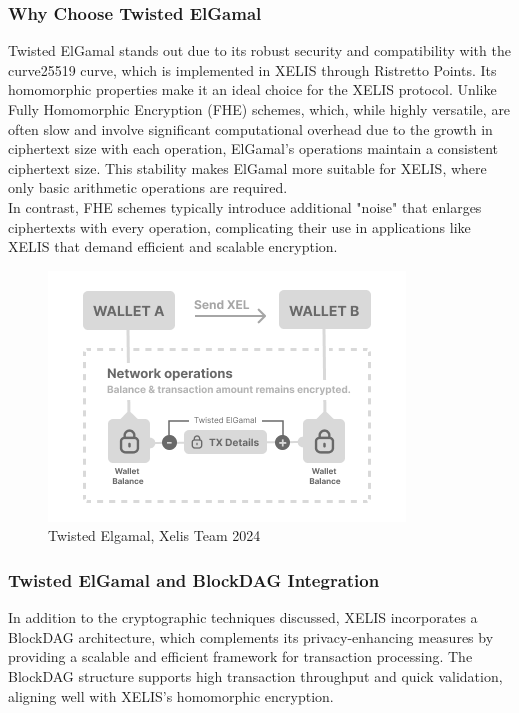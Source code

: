 \documentclass[10pt,a4paper,twocolumn]{article}
\begin{document}
\subsubsection{Why Choose Twisted ElGamal}

Twisted ElGamal stands out due to its robust security and compatibility with the curve25519 curve, which is implemented in XELIS through Ristretto Points. Its homomorphic properties make it an ideal choice for the XELIS protocol. Unlike Fully Homomorphic Encryption (FHE) schemes, which, while highly versatile, are often slow and involve significant computational overhead due to the growth in ciphertext size with each operation, ElGamal’s operations maintain a consistent ciphertext size. This stability makes ElGamal more suitable for XELIS, where only basic arithmetic operations are required.\\

In contrast, FHE schemes typically introduce additional "noise" that enlarges ciphertexts with every operation, complicating their use in applications like XELIS that demand efficient and scalable encryption.\\

\begin{figure}
    \centering
    \includegraphics[width=0.9\linewidth]{ElGamal Homomorphic XEL (1).png}
    \caption{Twisted Elgamal, Xelis Team 2024}
    \label{fig:enter-label}
\end{figure}


\subsubsection{Twisted ElGamal and BlockDAG Integration}

In addition to the cryptographic techniques discussed, XELIS incorporates a BlockDAG architecture, which complements its privacy-enhancing measures by providing a scalable and efficient framework for transaction processing. The BlockDAG structure supports high transaction throughput and quick validation, aligning well with XELIS’s homomorphic encryption.\\
\end{document}
